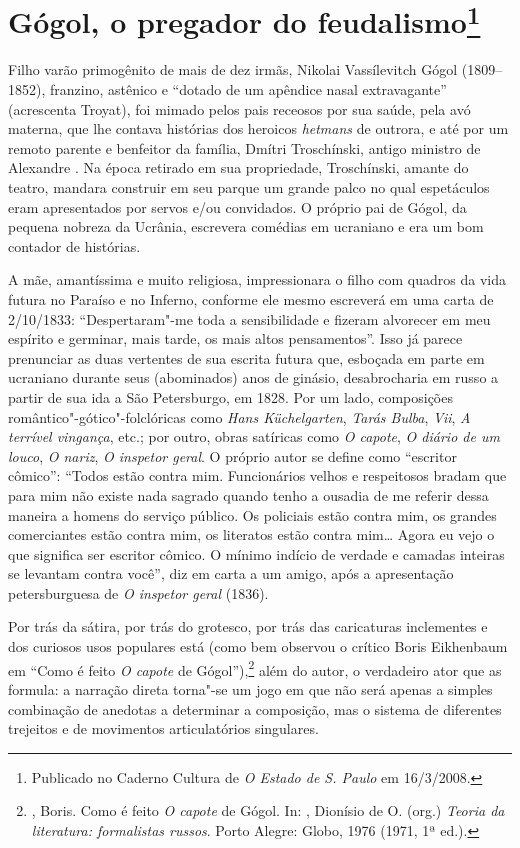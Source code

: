 \chapter{Gógol, o pregador do feudalismo\footnote{Publicado no Caderno Cultura de \emph{O Estado de S. Paulo} em 16/3/2008.}}

Filho varão primogênito de mais de dez irmãs, Nikolai Vassílevitch
Gógol (1809--1852), franzino, astênico e ``dotado de um apêndice nasal
extravagante'' (acrescenta Troyat), foi mimado pelos pais receosos por sua saúde, pela avó materna, que lhe contava histórias dos heroicos \emph{hetmans} de outrora, e até por um remoto parente e benfeitor da família, Dmítri Troschínski, antigo ministro de Alexandre . Na época retirado em sua propriedade, Troschínski, amante do teatro, mandara construir em seu parque um grande palco no qual espetáculos eram apresentados por servos e/ou convidados. O próprio pai de Gógol, da pequena nobreza da Ucrânia, escrevera comédias em ucraniano e era um bom contador de histórias.

A mãe, amantíssima e muito religiosa, impressionara o filho com quadros da vida futura no Paraíso e no Inferno, conforme ele mesmo escreverá em uma carta de 2/10/1833: ``Despertaram"-me toda a sensibilidade e fizeram alvorecer em meu espírito e germinar, mais tarde, os mais altos pensamentos''. Isso já parece prenunciar as duas vertentes de sua escrita futura que, esboçada em parte em ucraniano durante seus (abominados) anos de ginásio, desabrocharia em russo a partir de sua ida a São Petersburgo, em 1828. Por um lado, composições romântico"-gótico"-folclóricas como \emph{Hans Küchelgarten}, \emph{Tarás Bulba}, \emph{Vii}, \emph{A terrível vingança}, etc.; por outro, obras satíricas como \emph{O capote}, \emph{O diário de um louco}, \emph{O nariz}, \emph{O inspetor geral}. O próprio autor se define como ``escritor cômico'': ``Todos estão contra mim. Funcionários velhos e respeitosos bradam que para mim não existe nada sagrado quando tenho a ousadia de me referir dessa maneira a homens do serviço público. Os policiais estão contra mim, os grandes comerciantes estão contra mim, os literatos estão contra mim\ldots{} Agora eu vejo o que significa ser escritor cômico. O mínimo indício de verdade e camadas inteiras se levantam contra você'', diz em
carta a um amigo, após a apresentação petersburguesa de \emph{O inspetor geral} (1836).

Por trás da sátira, por trás do grotesco, por trás das caricaturas
inclementes e dos curiosos usos populares está (como bem observou o crítico Boris Eikhenbaum em ``Como é feito \emph{O capote} de Gógol''),\footnote{, Boris. Como é feito \emph{O capote} de Gógol. In: , Dionísio de O. (org.) \emph{Teoria da literatura: formalistas russos}. Porto Alegre: Globo, 1976 (1971, 1ª ed.).} além do autor, o verdadeiro ator que as formula: a narração direta torna"-se um jogo em que não será apenas a simples combinação de anedotas a determinar a composição, mas o sistema de diferentes trejeitos e de movimentos articulatórios singulares. 

